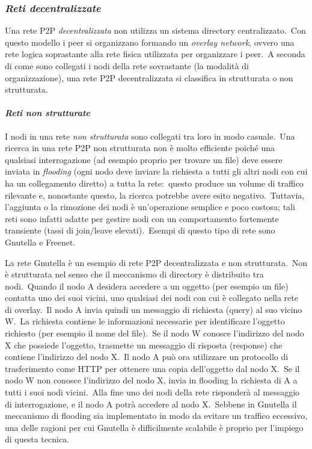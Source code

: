 \subsubsection{\emph{Reti decentralizzate}}

Una rete P2P \emph{decentralizzata} non utilizza un sistema directory centralizzato.\
Con questo modello i peer si organizzano formando un \emph{overlay network}, ovvero una rete logica soprastante alla rete fisica utilizzata per organizzare i peer.\
A seconda di come sono collegati i nodi della rete sovrastante (la modalità di organizzazione), una rete P2P decentralizzata si classifica in strutturata o non strutturata.

\paragraph{\emph{Reti non strutturate}}

I nodi in una rete \emph{non strutturata} sono collegati tra loro in modo casuale.\
Una ricerca in una rete P2P non strutturata non è molto efficiente poiché una qualsiasi interrogazione (ad esempio proprio per trovare un file) deve essere inviata in \emph{flooding} (ogni nodo deve inviare la richiesta a tutti gli altri nodi con cui ha un collegamento diretto) a tutta la rete:\ questo produce un volume di traffico rilevante e, nonostante questo, la ricerca potrebbe avere esito negativo.\
Tuttavia, l'aggiunta o la rimozione dei nodi è un'operazione semplice e poco costosa; tali reti sono infatti adatte per gestire nodi con un comportamento fortemente transiente (tassi di join/leave elevati).\
Esempi di questo tipo di rete sono Gnutella e Freenet.

La rete Gnutella è un esempio di rete P2P decentralizzata e non strutturata.\
Non è strutturata nel senso che il meccanismo di directory è distribuito tra nodi.\
Quando il nodo A desidera accedere a un oggetto (per esempio un file) contatta uno dei suoi vicini, uno qualsiasi dei nodi con cui è collegato nella rete di overlay.\
Il nodo A invia quindi un messaggio di richiesta (query) al suo vicino W.\
La richiesta contiene le informazioni necessarie per identificare l'oggetto richiesto (per esempio il nome del file).\
Se il nodo W conosce l'indirizzo del nodo X che possiede l'oggetto, trasmette un messaggio di risposta (response) che contiene l'indirizzo del nodo X.\
Il nodo A può ora utilizzare un protocollo di trasferimento come HTTP per ottenere una copia dell'oggetto dal nodo X.\
Se il nodo W non conosce l'indirizzo del nodo X, invia in flooding la richiesta di A a tutti i suoi nodi vicini.\
Alla fine uno dei nodi della rete risponderà al messaggio di interrogazione, e il nodo A potrà accedere al nodo X.\
Sebbene in Gnutella il meccanismo di flooding sia implementato in modo da evitare un traffico eccessivo, una delle ragioni per cui Gnutella è difficilmente scalabile è proprio per l'impiego di questa tecnica.

